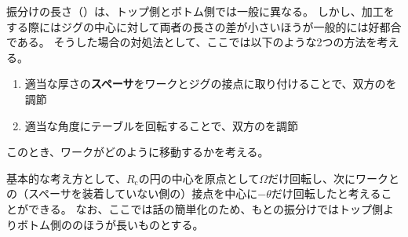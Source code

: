 

振分けの長さ（\textbf{\AlocationLength}）は、トップ側とボトム側では一般に異なる。
しかし、加工をする際にはジグの中心に対して両者の長さの差が小さいほうが一般的には好都合である。
そうした場合の対処法として、ここでは以下のような2つの方法を考える。
\begin{enumerate}
\item
適当な厚さの\textbf{スペーサ}をワークとジグの接点に取り付けることで、双方の\AlocationLength を調節
\item
適当な角度にテーブルを回転することで、双方の\AlocationLength を調節
\end{enumerate}
このとき、ワークがどのように移動するかを考える。

基本的な考え方として、\textbf{\CenterCurvatureRadius}$R_\mathrm c$の円の中心を原点として$\Omega$だけ回転し、次にワークとの（スペーサを装着していない側の）接点を中心に$-\theta$だけ回転したと考えることができる。
なお、ここでは話の簡単化のため、もとの振分けではトップ側よりボトム側の\AlocationLength のほうが長いものとする。



